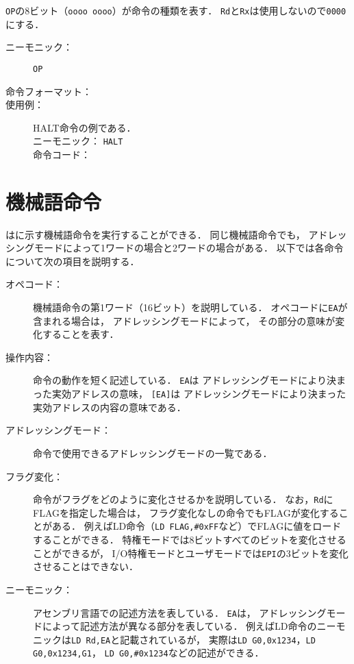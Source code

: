 \texttt{OP}の8ビット（\texttt{oooo oooo}）が命令の種類を表す．
\texttt{Rd}と\texttt{Rx}は使用しないので\texttt{0000}にする．

\begin{description}
\item[ニーモニック：] \texttt{OP}

\item[命令フォーマット：] %

\item[使用例：] HALT命令の例である．\\ 
ニーモニック： \texttt{HALT}\\
命令コード：
\end{description}

\section{機械語命令}

{\tac}はに示す機械語命令を実行することができる．
同じ機械語命令でも，
アドレッシングモードによって1ワードの場合と2ワードの場合がある．
以下では各命令について次の項目を説明する．

\begin{description}
\item[オペコード：]
機械語命令の第1ワード（16ビット）を説明している．
オペコードに\texttt{EA}が含まれる場合は，
アドレッシングモードによって，
その部分の意味が変化することを表す．

\item[操作内容：]
命令の動作を短く記述している．
\texttt{EA}は
アドレッシングモードにより決まった実効アドレスの意味，
\texttt{[EA]}は
アドレッシングモードにより決まった実効アドレスの内容の意味である．

\item[アドレッシングモード：]
命令で使用できるアドレッシングモードの一覧である．

\item[フラグ変化：]
命令がフラグをどのように変化させるかを説明している．
なお，\texttt{Rd}にFLAGを指定した場合は，
フラグ変化なしの命令でもFLAGが変化することがある．
例えばLD命令（\texttt{LD FLAG,\#0xFF}など）でFLAGに値をロードすることができる．
特権モードでは8ビットすべてのビットを変化させることができるが，
I/O特権モードとユーザモードでは\texttt{EPI}の3ビットを変化させることはできない．

\item[ニーモニック：]
アセンブリ言語での記述方法を表している．
\texttt{EA}は，
アドレッシングモードによって記述方法が異なる部分を表している．
例えばLD命令のニーモニックは\texttt{LD Rd,EA}と記載されているが，
実際は\texttt{LD G0,0x1234}，\texttt{LD G0,0x1234,G1}，
\texttt{LD G0,\#0x1234}などの記述ができる．
\end{description}


